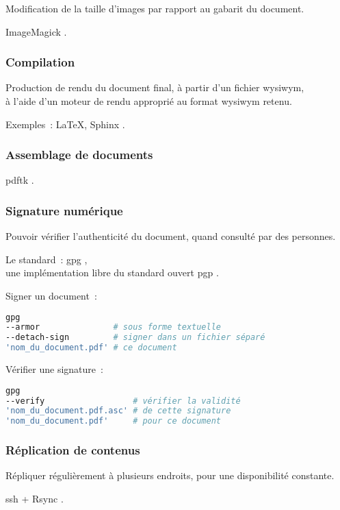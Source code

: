 Modification de la taille d’images par rapport au gabarit du document.

ImageMagick \cite{imagemagick}.

\subsubsection{Compilation}

Production de rendu du document final, à partir d’un fichier \gls{wysiwym},\\
à l’aide d’un moteur de rendu approprié au format \gls{wysiwym} retenu.

Exemples : \LaTeX \cite{latex}, Sphinx \cite{sphinx}.

\subsubsection{Assemblage de documents}

\gls{pdftk} \cite{pdftk}.

\subsubsection{Signature numérique}

Pouvoir vérifier l’authenticité du document, quand consulté par des personnes.

Le standard : \gls{gpg} \cite{gpg},\\
une implémentation libre du standard ouvert \gls{pgp} \cite{pgp}.

Signer un document :
\begin{lstlisting}[language=sh]
gpg
--armor               # sous forme textuelle
--detach-sign         # signer dans un fichier séparé
'nom_du_document.pdf' # ce document
\end{lstlisting}

Vérifier une signature :
\begin{lstlisting}[language=sh]
gpg
--verify                  # vérifier la validité
'nom_du_document.pdf.asc' # de cette signature
'nom_du_document.pdf'     # pour ce document
\end{lstlisting}

\subsubsection{Réplication de contenus}

Répliquer régulièrement à plusieurs endroits, pour une disponibilité constante.

\gls{ssh} \cite{ssh} + Rsync \cite{rsync}.

\pagebreak
